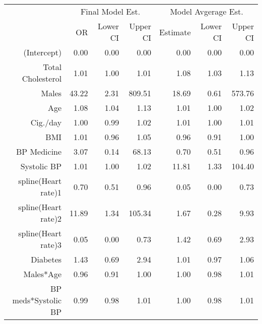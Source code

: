 \documentclass{article}\usepackage[]{graphicx}\usepackage[]{color}
\begin{document}
\begin{table}[ht]
\centering
\begin{tabular}{rrrr|rrr}
  \hline
  & \multicolumn{3}{c}{Final Model Est.} & \multicolumn{3}{c}{Model Avgerage Est.}\\

 & OR & Lower CI & Upper CI & Estimate & Lower CI & Upper CI \\ 
  \hline
(Intercept) & 0.00 & 0.00 & 0.00 & 0.00 & 0.00 & 0.00 \\ 
  Total Cholesterol & 1.01 & 1.00 & 1.01 & 1.08 & 1.03 & 1.13 \\ 
  Males & 43.22 & 2.31 & 809.51 & 18.69 & 0.61 & 573.76 \\ 
  Age & 1.08 & 1.04 & 1.13 & 1.01 & 1.00 & 1.02 \\ 
  Cig./day & 1.00 & 0.99 & 1.02 & 1.01 & 1.00 & 1.01 \\ 
  BMI & 1.01 & 0.96 & 1.05 & 0.96 & 0.91 & 1.00 \\ 
  BP Medicine & 3.07 & 0.14 & 68.13 & 0.70 & 0.51 & 0.96 \\ 
  Systolic BP & 1.01 & 1.00 & 1.02 & 11.81 & 1.33 & 104.40 \\ 
  spline(Heart rate)1 & 0.70 & 0.51 & 0.96 & 0.05 & 0.00 & 0.73 \\ 
  spline(Heart rate)2 & 11.89 & 1.34 & 105.34 & 1.67 & 0.28 & 9.93 \\ 
  spline(Heart rate)3 & 0.05 & 0.00 & 0.73 & 1.42 & 0.69 & 2.93 \\ 
  Diabetes & 1.43 & 0.69 & 2.94 & 1.01 & 0.97 & 1.06 \\ 
  Males*Age & 0.96 & 0.91 & 1.00 & 1.00 & 0.98 & 1.01 \\ 
  BP meds*Systolic BP & 0.99 & 0.98 & 1.01 & 1.00 & 0.98 & 1.01 \\ 
   \hline
\end{tabular}
\end{table}
\end{document}
